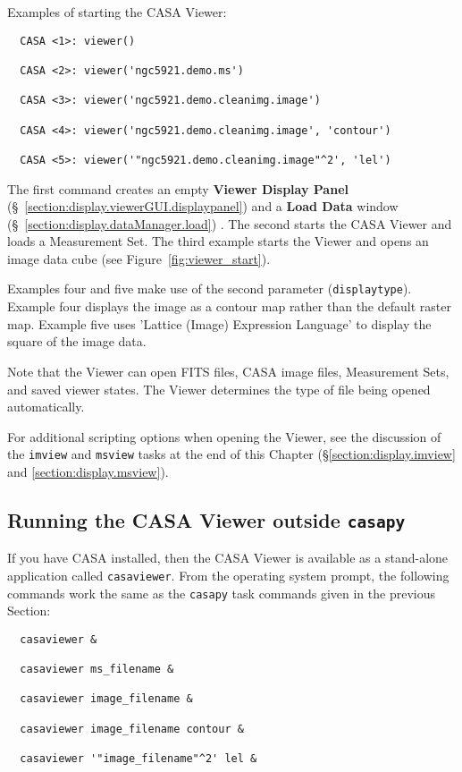 Examples of starting the CASA Viewer:
\small
\begin{verbatim}
  CASA <1>: viewer()

  CASA <2>: viewer('ngc5921.demo.ms')

  CASA <3>: viewer('ngc5921.demo.cleanimg.image')

  CASA <4>: viewer('ngc5921.demo.cleanimg.image', 'contour')
  
  CASA <5>: viewer('"ngc5921.demo.cleanimg.image"^2', 'lel')
\end{verbatim}
\normalsize

The first command creates an empty {\bf Viewer Display Panel} 
(\S~\ref{section:display.viewerGUI.displaypanel}) and a {\bf Load Data} 
window (\S~\ref{section:display.dataManager.load}) .  The second starts the
CASA Viewer and loads a Measurement Set.  The third example
starts the Viewer and opens an image data cube (see Figure~\ref{fig:viewer_start}).  

Examples four and five make use of the second parameter ({\tt displaytype}).  Example 
four displays the image as a contour map rather than the default raster map.  Example 
five uses 'Lattice (Image) Expression Language' to display the square of the image data.

Note that the Viewer can open FITS files, CASA image files, Measurement Sets,
and saved viewer states. The Viewer determines the type of file being opened automatically.

For additional scripting options when opening the Viewer, see the discussion of the 
{\tt imview} and {\tt msview} tasks at the end of this Chapter (\S \ref{section:display.imview} and
\ref{section:display.msview}).

\subsection{Running the CASA Viewer outside {\tt casapy}}
\label{section:display.start.casaviewer}

If you have CASA installed, then the CASA Viewer is available as a
stand-alone application called {\tt casaviewer}.  From the operating system prompt,
the following commands work the same as the {\tt casapy} task commands
given in the previous Section:

\small
\begin{verbatim}
  casaviewer &
  
  casaviewer ms_filename &
  
  casaviewer image_filename &
  
  casaviewer image_filename contour &
  
  casaviewer '"image_filename"^2' lel &
\end{verbatim}
\normalsize



